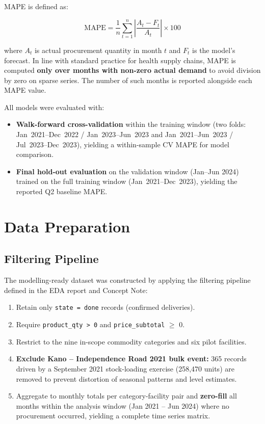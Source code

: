 \documentclass[12pt, a4paper]{article}
\begin{document}
\vspace{0.5em}

MAPE is defined as:

\[
  \text{MAPE} = \frac{1}{n} \sum_{t=1}^{n}
  \left| \frac{A_t - F_t}{A_t} \right| \times 100
\]

where $A_t$ is actual procurement quantity in month $t$ and $F_t$ is the
model's forecast. In line with standard practice for health supply chains,
MAPE is computed \textbf{only over months with non-zero actual demand} to
avoid division by zero on sparse series. The number of such months is
reported alongside each MAPE value.

All models were evaluated with:

\begin{itemize}[leftmargin=1.5em, itemsep=3pt]
  \item \textbf{Walk-forward cross-validation} within the training window
        (two folds: Jan~2021--Dec~2022 / Jan~2023--Jun~2023 and
        Jan~2021--Jun~2023 / Jul~2023--Dec~2023), yielding a
        within-sample CV MAPE for model comparison.
  \item \textbf{Final hold-out evaluation} on the validation window
        (Jan--Jun 2024) trained on the full training window
        (Jan~2021--Dec~2023), yielding the reported Q2 baseline MAPE.
\end{itemize}

\section{Data Preparation}

\subsection{Filtering Pipeline}

The modelling-ready dataset was constructed by applying the filtering
pipeline defined in the EDA report and Concept Note:

\begin{enumerate}[leftmargin=1.5em, itemsep=3pt]
  \item Retain only \texttt{state = done} records (confirmed deliveries).
  \item Require \texttt{product\_qty > 0} and \texttt{price\_subtotal} $\geq$ 0.
  \item Restrict to the nine in-scope commodity categories and six pilot
        facilities.
  \item \textbf{Exclude Kano -- Independence Road 2021 bulk event:}
        365 records driven by a September 2021 stock-loading exercise
        (258,470 units) are removed to prevent distortion of seasonal
        patterns and level estimates.
  \item Aggregate to monthly totals per category-facility pair and
        \textbf{zero-fill} all months within the analysis window
        (Jan 2021 -- Jun 2024) where no procurement occurred, yielding
        a complete time series matrix.
\end{enumerate}
\end{document}
